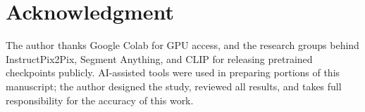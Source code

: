 \vspace{-4pt}
\section*{Acknowledgment}
The author thanks Google Colab for GPU access, and the research groups behind InstructPix2Pix, Segment Anything, and CLIP for releasing pretrained checkpoints publicly. AI-assisted tools were used in preparing portions of this manuscript; the author designed the study, reviewed all results, and takes full responsibility for the accuracy of this work.

